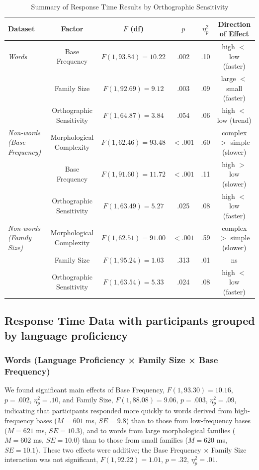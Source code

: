 	\begin{table}[ht]
		\centering
		\caption{Summary of Response Time Results by Orthographic Sensitivity}
		\begin{tabular}{lccccc}
			\toprule
			\textbf{Dataset} & \textbf{Factor} & \textbf{$F$ (df)} & \textbf{$p$} & \textbf{$\eta^2_p$} & \textbf{Direction of Effect} \\
			\midrule
			\textit{Words} & Base Frequency & $F(1, 93.84) = 10.22$ & .002 & .10 & high $<$ low (faster) \\
			& Family Size & $F(1, 92.69) = 9.12$ & .003 & .09 & large $<$ small (faster) \\
			& Orthographic Sensitivity & $F(1, 64.87) = 3.84$ & .054 & .06 & high $<$ low (trend) \\
			\midrule
			\textit{Non-words (Base Frequency)} & Morphological Complexity & $F(1, 62.46) = 93.48$ & $< .001$ & .60 & complex $>$ simple (slower) \\
			& Base Frequency & $F(1, 91.60) = 11.72$ & $< .001$ & .11 & high $>$ low (slower) \\
			& Orthographic Sensitivity & $F(1, 63.49) = 5.27$ & .025 & .08 & high $<$ low (faster) \\
			\midrule
			\textit{Non-words (Family Size)} & Morphological Complexity & $F(1, 62.51) = 91.00$ & $< .001$ & .59 & complex $>$ simple (slower) \\
			& Family Size & $F(1, 95.24) = 1.03$ & .313 & .01 & ns \\
			& Orthographic Sensitivity & $F(1, 63.54) = 5.33$ & .024 & .08 & high $<$ low (faster) \\
			\bottomrule
		\end{tabular}
	\end{table}

\subsection{Response Time Data with participants grouped by language proficiency}

	\subsubsection{Words (Language Proficiency × Family Size × Base Frequency) }
	
	We found significant main effects of Base Frequency, $F(1, 93.30) = 10.16$, $p = .002$, $\eta_p^2 = .10$, and Family Size, $F(1, 88.08) = 9.06$, $p = .003$, $\eta_p^2 = .09$, indicating that participants responded more quickly to words derived from high-frequency bases ($M = 601$ ms, $SE = 9.8$) than to those from low-frequency bases ($M = 621$ ms, $SE = 10.3$), and to words from large morphological families ($M = 602$ ms, $SE = 10.0$) than to those from small families ($M = 620$ ms, $SE = 10.1$). These two effects were additive; the Base Frequency × Family Size interaction was not significant, $F(1, 92.22) = 1.01$, $p = .32$, $\eta_p^2 = .01$. 
	
